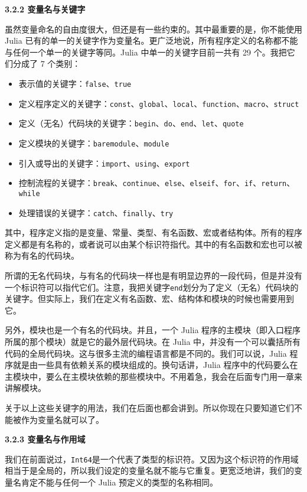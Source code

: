 \textbf{3.2.2 变量名与关键字}

虽然变量命名的自由度很大，但还是有一些约束的。其中最重要的是，你不能使用 Julia 已有的单一的关键字作为变量名。更广泛地说，所有程序定义的名称都不能与任何一个单一的关键字等同。Julia 中单一的关键字目前一共有 29 个。我把它们分成了 7 个类别：

\begin{itemize}
\item 表示值的关键字：\verb|false|、\verb|true|
\item 定义程序定义的关键字：\verb|const|、\verb|global|、\verb|local|、\verb|function|、\verb|macro|、\verb|struct|
\item 定义（无名）代码块的关键字：\verb|begin|、\verb|do|、\verb|end|、\verb|let|、\verb|quote|
\item 定义模块的关键字：\verb|baremodule|、\verb|module|
\item 引入或导出的关键字：\verb|import|、\verb|using|、\verb|export|
\item 控制流程的关键字：\verb|break|、\verb|continue|、\verb|else|、\verb|elseif|、\verb|for|、\verb|if|、\verb|return|、\verb|while|
\item 处理错误的关键字：\verb|catch|、\verb|finally|、\verb|try|
\end{itemize}

其中，程序定义指的是变量、常量、类型、有名函数、宏或者结构体。所有的程序定义都是有名称的，或者说可以由某个标识符指代。其中的有名函数和宏也可以被称为有名的代码块。

所谓的无名代码块，与有名的代码块一样也是有明显边界的一段代码，但是并没有一个标识符可以指代它们。注意，我把关键字\verb|end|划分为了定义（无名）代码块的关键字。但实际上，我们在定义有名函数、宏、结构体和模块的时候也需要用到它。

另外，模块也是一个有名的代码块。并且，一个 Julia 程序的主模块（即入口程序所属的那个模块）就是它的最外层代码块。在 Julia 中，并没有一个可以囊括所有代码的全局代码块。这与很多主流的编程语言都是不同的。我们可以说，Julia 程序就是由一些具有依赖关系的模块组成的。换句话讲，Julia 程序中的代码要么在主模块中，要么在主模块依赖的那些模块中。不用着急，我会在后面专门用一章来讲解模块。

关于以上这些关键字的用法，我们在后面也都会讲到。所以你现在只要知道它们不能被作为变量名就可以了。

\textbf{3.2.3 变量名与作用域}

我们在前面说过，\verb|Int64|是一个代表了类型的标识符。又因为这个标识符的作用域相当于是全局的，所以我们设定的变量名就不能与它重复。更宽泛地讲，我们的变量名肯定不能与任何一个 Julia 预定义的类型的名称相同。

